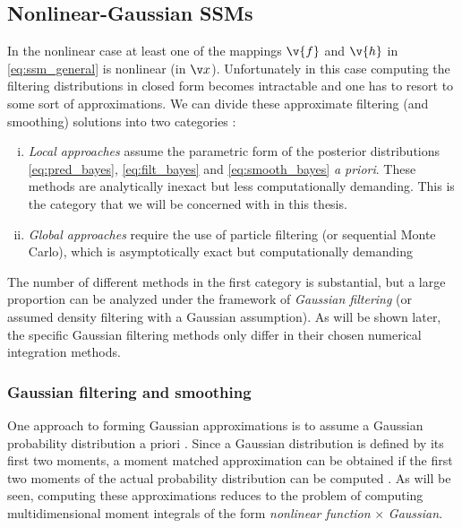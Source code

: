 \subsection{Nonlinear-Gaussian SSMs}%
\label{sec:nonlinear_state}
In the nonlinear case at least one of the mappings $\v{f}$ and $\v{h}$ in
\eqref{eq:ssm_general} is nonlinear (in $\x$). Unfortunately in this case computing the filtering
distributions in closed form becomes intractable and one has to resort to 
some sort of approximations. We can
divide these approximate filtering (and smoothing) solutions into two 
categories \parencite[see, e.g.,][]{Arasaratnam2009}: 
\begin{enumerate}[i)] \addtolength{\leftskip}{.5cm} \itemsep1pt \parskip0pt 
  \item \emph{Local approaches} assume the parametric form of the posterior
  distributions \eqref{eq:pred_bayes}, \eqref{eq:filt_bayes} and \eqref{eq:smooth_bayes} \emph{a priori}. 
  These  methods are analytically inexact but less computationally demanding. This is the category that
we will be concerned with in this thesis. 
  \item \emph{Global approaches} require the use of particle filtering (or sequential Monte Carlo), 
  which is asymptotically exact but computationally demanding
\end{enumerate}%
%
The number of different methods in the first category is substantial,
but a large proportion can be analyzed under the framework of
\emph{Gaussian filtering} (or assumed density filtering
with a Gaussian assumption). As will be shown later, the specific Gaussian filtering 
methods only differ in their chosen numerical integration methods.  

\subsubsection{Gaussian filtering and smoothing}

One approach to forming Gaussian approximations is to assume a Gaussian
probability distribution a priori \parencite{Kushner1967,Ito2000,Wu2006,Sarkka2010}. 
Since a Gaussian distribution is 
defined by its first two moments, a moment matched approximation
can be obtained if the first two moments of the actual probability
distribution can be computed \parencite{Ito2000,Sarkka2006}. As will
be seen, computing these approximations reduces to the problem
of computing multidimensional moment integrals of the form 
\emph{nonlinear function} $\times$ \emph{Gaussian}. 


